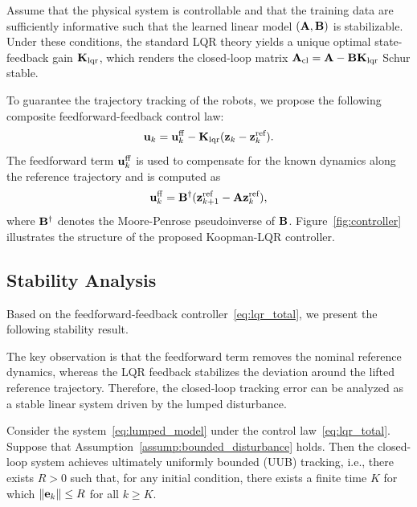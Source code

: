 Assume that the physical system is controllable and that the training data are sufficiently informative such that the learned linear model $(\mathbf{A},\mathbf{B})$ is stabilizable. Under these conditions, the standard LQR theory yields a unique optimal state-feedback gain $\mathbf{K}_{\text{lqr}}$, which renders the closed-loop matrix $\mathbf{A}_{\text{cl}} = \mathbf{A} - \mathbf{B}\mathbf{K}_{\text{lqr}}$ Schur stable.

To guarantee the trajectory tracking of the robots, we propose the following composite feedforward-feedback control law:
\begin{equation}
\label{eq:lqr_total}
\mathbf{u}_k = \mathbf{u}_k^{\mathrm{ff}} - \mathbf{K}_{\text{lqr}}(\mathbf{z}_k - \mathbf{z}_k^{\text{ref}}).
\end{equation}
The feedforward term $\mathbf{u}_k^{\mathrm{ff}}$ is used to compensate for the known dynamics along the reference trajectory and is computed as
\begin{equation}
\label{eq:uff}
\mathbf{u}_k^{\mathrm{ff}} = \mathbf{B}^{\dagger}(\mathbf{z}_{k+1}^{\text{ref}} - \mathbf{A}\mathbf{z}_k^{\text{ref}}),
\end{equation}
where $\mathbf{B}^{\dagger}$ denotes the Moore-Penrose pseudoinverse of $\mathbf{B}$. Figure~\ref{fig:controller} illustrates the structure of the proposed Koopman-LQR controller.

\subsection{Stability Analysis}
\label{subsec:lqr_robust}

Based on the feedforward-feedback controller~\eqref{eq:lqr_total}, we present the following stability result.

The key observation is that the feedforward term removes the nominal reference dynamics, whereas the LQR feedback stabilizes the deviation around the lifted reference trajectory. Therefore, the closed-loop tracking error can be analyzed as a stable linear system driven by the lumped disturbance.

\begin{theorem}
\label{thm:lqr_uub}
Consider the system~\eqref{eq:lumped_model} under the control law~\eqref{eq:lqr_total}. Suppose that Assumption~\ref{assump:bounded_disturbance} holds. Then the closed-loop system achieves ultimately uniformly bounded (UUB) tracking, i.e., there exists $R > 0$ such that, for any initial condition, there exists a finite time $K$ for which $\|\mathbf{e}_k\| \le R$ for all $k \ge K$.
\end{theorem}

